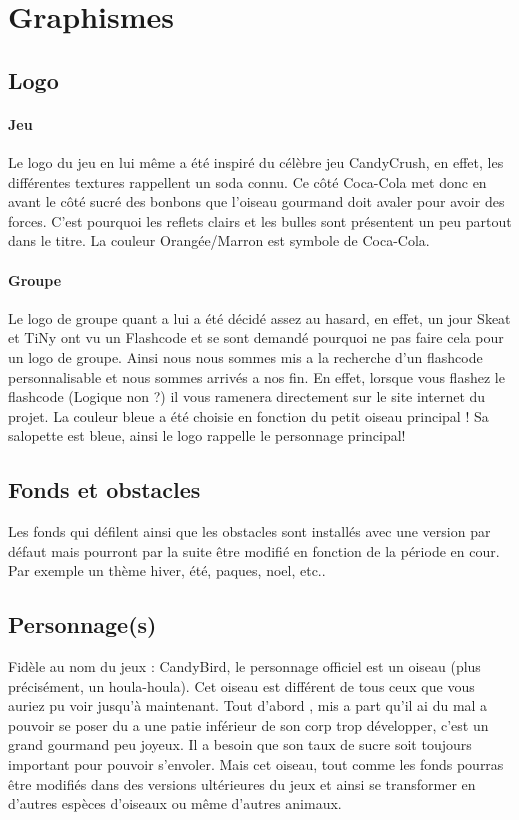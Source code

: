 \documentclass [11pt]{report}
\begin{document}
	\section{Graphismes}
		\subsection {Logo}
			\paragraph{Jeu}
			Le logo du jeu en lui même a été inspiré du célèbre jeu CandyCrush, en effet, les différentes textures rappellent un soda connu. Ce côté Coca-Cola met donc en avant le côté sucré des bonbons que l'oiseau gourmand doit avaler pour avoir des forces. C'est pourquoi les reflets clairs et les bulles sont présentent un peu partout dans le titre. La couleur Orangée/Marron est symbole de Coca-Cola.
			\paragraph{Groupe}
			Le logo de groupe quant a lui a été décidé assez au hasard, en effet, un jour Skeat et TiNy ont vu un Flashcode et se sont demandé pourquoi ne pas faire cela pour un logo de groupe. Ainsi nous nous sommes mis a la recherche d'un flashcode personnalisable et nous sommes arrivés a nos fin. En effet, lorsque vous flashez le flashcode (Logique non ?) il vous ramenera directement sur le site internet du projet. La couleur bleue a été choisie en fonction du petit oiseau principal ! Sa salopette est bleue, ainsi le logo rappelle le personnage principal!

		\subsection {Fonds et obstacles}
 		Les fonds qui défilent ainsi que les obstacles sont installés avec une version par défaut mais pourront par la suite être modifié en fonction de la période en cour. Par exemple un thème hiver, été, paques, noel, etc..\\\vspace{5mm}

		\subsection {Personnage(s)}
 		Fidèle au nom du jeux : CandyBird, le personnage officiel est un oiseau (plus précisément, un houla-houla).
 		Cet oiseau est différent de tous ceux que vous auriez pu voir jusqu'à maintenant. Tout d'abord , mis a part qu'il ai du mal a pouvoir se poser du a une patie inférieur de son corp trop développer, c'est un grand gourmand peu joyeux. Il a besoin que son taux de sucre soit toujours important pour pouvoir s'envoler. Mais cet oiseau, tout comme les fonds pourras être modifiés dans des versions ultérieures du jeux et ainsi se transformer en d'autres espèces d'oiseaux ou même d'autres animaux.\\\vspace{5mm}
\end{document}
